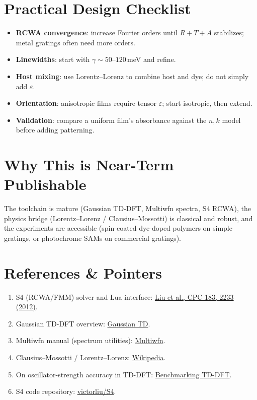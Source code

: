 \documentclass[11pt,a4paper]{article}
\begin{document}
\section{Practical Design Checklist}
\begin{itemize}
  \item \textbf{RCWA convergence}: increase Fourier orders until $R+T+A$ stabilizes; metal gratings often need more orders.
  \item \textbf{Linewidths}: start with $\gamma\sim 50$--$120$\,meV and refine.
  \item \textbf{Host mixing}: use Lorentz--Lorenz to combine host and dye; do not simply add $\varepsilon$.
  \item \textbf{Orientation}: anisotropic films require tensor $\varepsilon$; start isotropic, then extend.
  \item \textbf{Validation}: compare a uniform film's absorbance against the $n,k$ model before adding patterning.
\end{itemize}

\section{Why This is Near-Term Publishable}
The toolchain is mature (Gaussian TD-DFT, Multiwfn spectra, S4 RCWA), the physics bridge (Lorentz--Lorenz / Clausius--Mossotti) is classical and robust, and the experiments are accessible (spin-coated dye-doped polymers on simple gratings, or photochrome SAMs on commercial gratings).

\section*{References \& Pointers}
\begin{enumerate}
  \item S4 (RCWA/FMM) solver and Lua interface: \href{https://web.stanford.edu/group/fan/publication/Liu_ComputerPhysicsCommunications_183_2233_2012.pdf}{Liu et al., CPC 183, 2233 (2012)}.
  \item Gaussian TD-DFT overview: \href{https://gaussian.com/td/}{Gaussian TD}.
  \item Multiwfn manual (spectrum utilities): \href{https://sobereva.com/multiwfn/misc/Multiwfn_3.8_dev.pdf}{Multiwfn}.
  \item Clausius--Mossotti / Lorentz--Lorenz: \href{https://en.wikipedia.org/wiki/Clausius%E2%80%93Mossotti_relation}{Wikipedia}.
  \item On oscillator-strength accuracy in TD-DFT: \href{https://pfloos.github.io/WEB_LOOS/pub/97.pdf}{Benchmarking TD-DFT}.
  \item S4 code repository: \href{https://github.com/victorliu/S4}{victorliu/S4}.
\end{enumerate}
\end{document}
